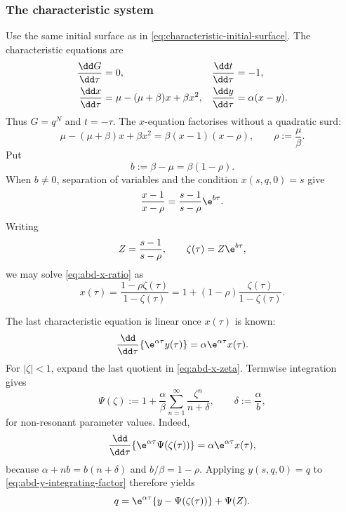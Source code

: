 \subsubsection{The characteristic system}

Use the same initial surface as in \cref{eq:characteristic-initial-surface}.  The
characteristic equations are
\begin{align}
  \frac{\dd G}{\dd\tau}&=0,
  &\frac{\dd t}{\dd\tau}&=-1,
  \notag\\
  \frac{\dd x}{\dd\tau}
    &=\mu-(\mu+\beta)x+\beta x^2,
  &\frac{\dd y}{\dd\tau}&=\alpha(x-y).
  \label{eq:abd-characteristics}
\end{align}
Thus \(G=q^N\) and \(t=-\tau\).  The \(x\)-equation factorises without a
quadratic surd:
\begin{equation}
  \mu-(\mu+\beta)x+\beta x^2
  =\beta(x-1)(x-\rho),
  \qquad
  \rho:=\frac{\mu}{\beta}.
  \label{eq:abd-factorisation}
\end{equation}
Put
\begin{equation}
  b:=\beta-\mu=\beta(1-\rho).
  \label{eq:abd-net-growth}
\end{equation}
When \(b\neq0\), separation of variables and the condition \(x(s,q,0)=s\)
give
\begin{equation}
  \frac{x-1}{x-\rho}
  =\frac{s-1}{s-\rho}\e^{b\tau}.
  \label{eq:abd-x-ratio}
\end{equation}
Writing
\begin{equation}
  Z=\frac{s-1}{s-\rho},
  \qquad
  \zeta(\tau)=Z\e^{b\tau},
  \label{eq:abd-zeta}
\end{equation}
we may solve \cref{eq:abd-x-ratio} as
\begin{equation}
  x(\tau)
  =\frac{1-\rho\zeta(\tau)}{1-\zeta(\tau)}
  =1+(1-\rho)\frac{\zeta(\tau)}{1-\zeta(\tau)}.
  \label{eq:abd-x-zeta}
\end{equation}

The last characteristic equation is linear once \(x(\tau)\) is known:
\begin{equation}
  \frac{\dd}{\dd\tau}\{\e^{\alpha\tau}y(\tau)\}
  =\alpha\e^{\alpha\tau}x(\tau).
  \label{eq:abd-y-integrating-factor}
\end{equation}
For \(|\zeta|<1\), expand the last quotient in
\cref{eq:abd-x-zeta}.  Termwise integration gives
\begin{equation}
  \Psi(\zeta)
  :=1+\frac{\alpha}{\beta}
       \sum_{n=1}^{\infty}\frac{\zeta^n}{n+\delta},
  \qquad
  \delta:=\frac{\alpha}{b},
  \label{eq:Psi-series}
\end{equation}
for non-resonant parameter values.  Indeed,
\begin{equation}
  \frac{\dd}{\dd\tau}
  \{\e^{\alpha\tau}\Psi(\zeta(\tau))\}
  =\alpha\e^{\alpha\tau}x(\tau),
  \label{eq:Psi-antiderivative}
\end{equation}
because \(\alpha+nb=b(n+\delta)\) and
\(b/\beta=1-\rho\).  Applying \(y(s,q,0)=q\) to
\cref{eq:abd-y-integrating-factor} therefore yields
\begin{equation}
  q=\e^{\alpha\tau}\{y-\Psi(\zeta(\tau))\}+\Psi(Z).
  \label{eq:abd-q-characteristic}
\end{equation}


